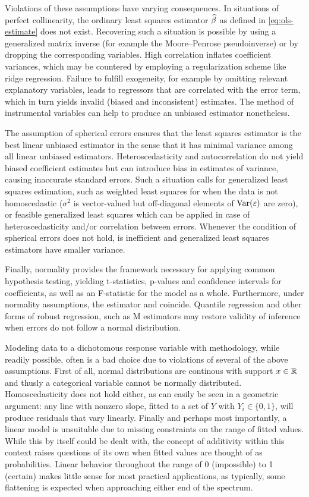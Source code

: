 Violations of these assumptions have varying consequences. In situations of perfect collinearity, the ordinary least squares estimator $\widehat{\beta}$ as defined in \eqref{eq:ols-estimate} does not exist. Recovering such a situation is possible by using a generalized matrix inverse (for example the Moore--Penrose pseudoinverse) or by dropping the corresponding variables. High correlation inflates coefficient variances, which may be countered by employing a regularization scheme like ridge regression. Failure to fulfill exogeneity, for example by omitting relevant explanatory variables, leads to regressors that are correlated with the error term, which in turn yields invalid (biased and inconsistent)  estimates. The method of instrumental variables can help to produce an unbiased estimator nonetheless.

The assumption of spherical errors ensures that the least squares estimator is the best linear unbiased estimator in the sense that it has minimal variance among all linear unbiased estimators. Heteroscedasticity and autocorrelation do not yield biased coefficient estimates but can introduce bias in  estimates of variance, causing inaccurate standard errors. Such a situation calls for generalized least squares estimation, such as weighted least squares for when the data is not homoscedastic ($\sigma^2$ is vector-valued but off-diagonal elements of $\operatorname{Var}(\varepsilon)$ are zero), or feasible generalized least squares which can be applied in case of heteroscedasticity and\slash or correlation between errors. Whenever the condition of spherical errors does not hold,  is inefficient and generalized least squares estimators have smaller variance.

Finally, normality provides the framework necessary for applying common hypothesis testing, yielding t-statistics, p-values and confidence intervals for coefficients, as well as an F-statistic for the model as a whole. Furthermore, under normality assumptions, the  estimator and  coincide. Quantile regression and other forms of robust regression, such as M estimators may restore validity of inference when errors do not follow a normal distribution.

Modeling data to a dichotomous response variable with  methodology, while readily possible, often is a bad choice due to violations of several of the above assumptions. First of all, normal distributions are continous with support $x \in \mathbb{R}$ and thusly a categorical variable cannot be normally distributed. Homoscedasticity does not hold either, as can easily be seen in a geometric argument: any line with nonzero slope, fitted to a set of $Y$ with $Y_i \in \{0,1\}$, will produce residuals that vary linearly. Finally and perhaps most importantly, a linear model is unsuitable due to missing constraints on the range of fitted values. While this by itself could be dealt with, the concept of additivity within this context raises questions of its own when fitted values are thought of as probabilities. Linear behavior throughout the range of 0 (impossible) to 1 (certain) makes little sense for most practical applications, as typically, some flattening is expected when approaching either end of the spectrum.

